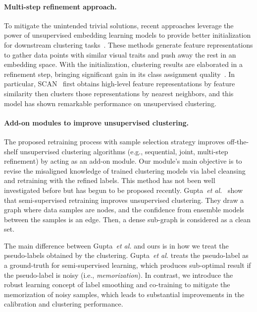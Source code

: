 \documentclass[final]{cvpr}
\newcommand{\cutparagraphup}{\vspace*{-0.15in}}
\begin{document}
\paragraph{Multi-step refinement approach.} To mitigate the unintended trivial solutions, recent approaches leverage the power of unsupervised embedding learning models to provide better initialization for downstream clustering tasks~\cite{chen2020simple,wu2018unsupervised,2020superand}. These methods generate feature representations to gather data points with similar visual traits and push away the rest in an embedding space. With the initialization, clustering results are elaborated in a refinement step, bringing significant gain in its class assignment quality~\cite{hanmitigating,van2020scan}. In particular, SCAN~\cite{van2020scan} first obtains high-level feature representations by feature similarity then clusters those representations by nearest neighbors, and this model has shown remarkable performance on unsupervised clustering.

\cutparagraphup
\paragraph{Add-on modules to improve unsupervised clustering.}
The proposed retraining process with sample selection strategy improves off-the-shelf unsupervised clustering algorithms (e.g., sequential, joint, multi-step refinement) by acting as an add-on module. Our module's main objective is to revise the misaligned knowledge of trained clustering models via label cleansing and retraining with the refined labels. This method has not been well investigated before but has begun to be proposed recently. Gupta~\emph{et al.}~\cite{gupta2020unsupervised} show that semi-supervised retraining improves unsupervised clustering. They draw a graph where data samples are nodes, and the confidence from ensemble models between the samples is an edge. Then, a dense sub-graph is considered as a clean set. 

The main difference between Gupta~\emph{et al.} and ours is in how we treat the pseudo-labels obtained by the clustering. Gupta~\emph{et al.} treats the pseudo-label as a ground-truth for semi-supervised learning, which produces sub-optimal result if the pseudo-label is noisy (i.e., \textit{memorization}). In contrast, we introduce the robust learning concept of label smoothing and co-training to mitigate the memorization of noisy samples, which leads to substantial improvements in the calibration and clustering performance.
\end{document}
